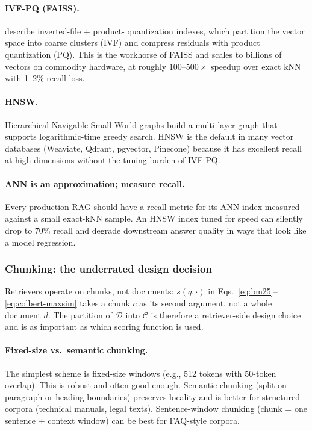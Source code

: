 \paragraph{IVF-PQ (FAISS).}
\citet{johnson2019faiss} describe inverted-file + product-
quantization indexes, which partition the vector space into
coarse clusters (IVF) and compress residuals with product
quantization (PQ). This is the workhorse of FAISS and scales to
billions of vectors on commodity hardware, at roughly
$100\text{--}500\times$ speedup over exact kNN with 1--2\% recall
loss.

\paragraph{HNSW.}
Hierarchical Navigable Small World graphs
\citep{malkov2020hnsw} build a multi-layer graph that supports
logarithmic-time greedy search. HNSW is the default in many
vector databases (Weaviate, Qdrant, pgvector, Pinecone) because it
has excellent recall at high dimensions without the tuning burden
of IVF-PQ.

\paragraph{ANN is an approximation; measure recall.}
Every production RAG should have a recall metric for its ANN
index measured against a small exact-kNN sample. An HNSW index
tuned for speed can silently drop to 70\% recall and degrade
downstream answer quality in ways that look like a model
regression.

\subsubsection{Chunking: the underrated design decision}

Retrievers operate on chunks, not documents: $s(q, \cdot)$ in
Eqs.~\eqref{eq:bm25}--\eqref{eq:colbert-maxsim} takes a chunk $c$
as its second argument, not a whole document $d$. The partition of
$\mathcal{D}$ into $\mathcal{C}$ is therefore a retriever-side design choice
and is as important as which scoring function is used.

\paragraph{Fixed-size vs.\ semantic chunking.}
The simplest scheme is fixed-size windows (e.g., 512 tokens with
50-token overlap). This is robust and often good enough. Semantic
chunking (split on paragraph or heading boundaries) preserves
locality and is better for structured corpora (technical manuals,
legal texts). Sentence-window chunking (chunk = one sentence +
context window) can be best for FAQ-style corpora.

